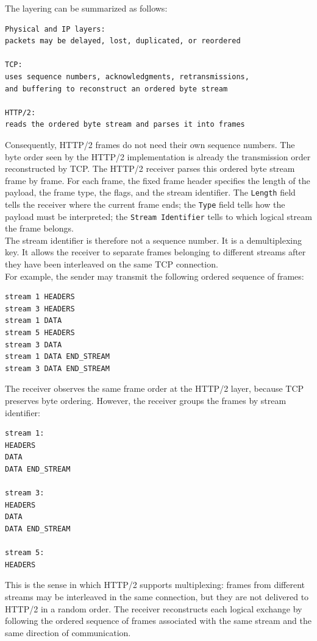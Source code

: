 \documentclass{scrbook}
\begin{document}
The layering can be summarized as follows:

\begin{lstlisting}
Physical and IP layers:
packets may be delayed, lost, duplicated, or reordered
	
TCP:
uses sequence numbers, acknowledgments, retransmissions,
and buffering to reconstruct an ordered byte stream
	
HTTP/2:
reads the ordered byte stream and parses it into frames
\end{lstlisting}

Consequently, HTTP/2 frames do not need their own sequence numbers. The byte order seen by the HTTP/2 implementation is already the transmission order reconstructed by TCP. The HTTP/2 receiver parses this ordered byte stream frame by frame. For each frame, the fixed frame header specifies the length of the payload, the frame type, the flags, and the stream identifier. The \texttt{Length} field tells the receiver where the current frame ends; the \texttt{Type} field tells how the payload must be interpreted; the \texttt{Stream Identifier} tells to which logical stream the frame belongs.\\

The stream identifier is therefore not a sequence number. It is a demultiplexing key. It allows the receiver to separate frames belonging to different streams after they have been interleaved on the same TCP connection.\\

For example, the sender may transmit the following ordered sequence of frames:

\begin{lstlisting}
stream 1 HEADERS
stream 3 HEADERS
stream 1 DATA
stream 5 HEADERS
stream 3 DATA
stream 1 DATA END_STREAM
stream 3 DATA END_STREAM
\end{lstlisting}

The receiver observes the same frame order at the HTTP/2 layer, because TCP preserves byte ordering. However, the receiver groups the frames by stream identifier:

\begin{lstlisting}
stream 1:
HEADERS
DATA
DATA END_STREAM

stream 3:
HEADERS
DATA
DATA END_STREAM

stream 5:
HEADERS
\end{lstlisting}

This is the sense in which HTTP/2 supports multiplexing: frames from different streams may be interleaved in the same connection, but they are not delivered to HTTP/2 in a random order. The receiver reconstructs each logical exchange by following the ordered sequence of frames associated with the same stream and the same direction of communication.\\
\end{document}
